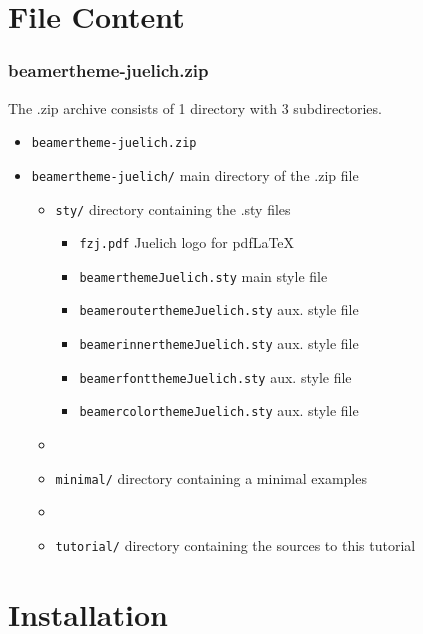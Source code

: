 \documentclass[
t, %
10pt, %
aspectratio=1610, %
ngerman,
english,
]{beamer}
\begin{document}
\section{File Content}
\begin{frame}[fragile]
	\frametitle{beamertheme-juelich.zip}
	The .zip archive consists of 1 directory with 3 subdirectories.
	\begin{itemize}
      \item \verb+beamertheme-juelich.zip+
      \item \verb+beamertheme-juelich/+ \hfill main directory of the .zip file
      \begin{itemize}
        \item \verb+sty/+ \hfill directory containing the .sty files
        \begin{itemize}
          \item \verb+fzj.pdf+ \hfill Juelich logo for pdf\LaTeX
          \item \verb+beamerthemeJuelich.sty+ \hfill main style file
          \item \verb+beamerouterthemeJuelich.sty+ \hfill aux. style file
          \item \verb+beamerinnerthemeJuelich.sty+ \hfill aux. style file
          \item \verb+beamerfontthemeJuelich.sty+ \hfill aux. style file
          \item \verb+beamercolorthemeJuelich.sty+ \hfill aux. style file
        \end{itemize}
        \item[]
        \item \verb+minimal/+ \hfill directory containing a minimal examples
        \item[] 
        \item \verb+tutorial/+ \hfill directory containing the sources to this tutorial
      \end{itemize}
    \end{itemize}
\end{frame}

\section{Installation}
\end{document}
